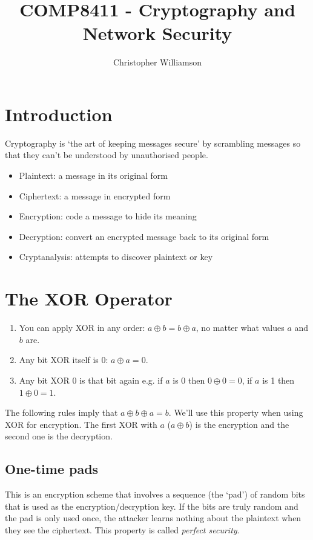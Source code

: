 \documentclass{article}
\begin{document}
\title{COMP8411 - Cryptography and Network Security}
\author{Christopher Williamson}
\maketitle
\tableofcontents
\newpage
\section{Introduction}
Cryptography is `the art of keeping messages secure' by scrambling messages so that they can't be understood by unauthorised people.
\begin{itemize}
	\item Plaintext: a message in its original form
	\item Ciphertext: a message in encrypted form
	\item Encryption: code a message to hide its meaning
	\item Decryption: convert an encrypted message back to its original form
	\item Cryptanalysis: attempts to discover plaintext or key
\end{itemize}

\section{The XOR Operator}
\begin{enumerate}
	\item You can apply XOR in any order: $a \oplus b = b \oplus a$, no matter what values $a$ and $b$ are.
	\item Any bit XOR itself is 0: $a \oplus a = 0$.
	\item Any bit XOR 0 is that bit again e.g. if $a$ is 0 then $0 \oplus 0 = 0$, if $a$ is 1 then $1 \oplus 0 = 1$.
\end{enumerate}
The following rules imply that $a \oplus b \oplus a = b$. We'll use this property when using XOR for encryption. The first XOR with $a$ ($a \oplus b$) is the encryption and the second one is the decryption.

\subsection{One-time pads}
This is an encryption scheme that involves a sequence (the `pad') of random bits that is used as the encryption/decryption key. If the bits are truly random and the pad is only used once, the attacker learns nothing about the plaintext when they see the ciphertext. This property is called \textit{perfect security}.
\end{document}
